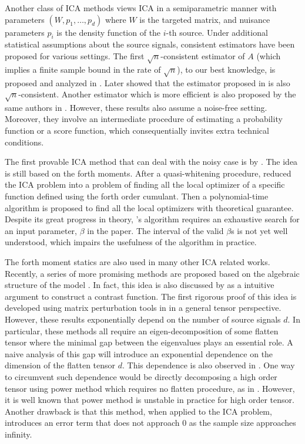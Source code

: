 \documentclass[twoside]{article}
\theoremstyle{definition}
\begin{document}
Another class of ICA methods views ICA in a semiparametric manner with parameters $(W, p_1, \ldots, p_d)$ where $W$ is the targeted matrix, and nuisance parameters $p_i$ is the density function of the $i$-th source. 
Under additional statistical assumptions about the source signals, consistent estimators have been proposed for various settings. The first  $\sqrt{n}$-consistent estimator of $A$ (which implies a finite sample bound in the rate of $\sqrt{n}$), to our best knowledge, is proposed and analyzed in \citet{samarov2004nonparametric}.  
Later \citep{chen2005consistent} showed that the estimator proposed in \citet{eriksson2003characteristic} is also $\sqrt{n}$-consistent. Another estimator which is more efficient is also proposed by the same authors in \citep{chen2006efficient}.
However, these results also assume a noise-free setting. 
Moreover, they involve an intermediate procedure of estimating a probability function or a score function, which consequentially invites extra technical conditions. 

The first provable ICA method that can deal with the noisy case is by \citep{arora2012provable}. 
The idea is still based on the forth moments. 
After a quasi-whitening procedure, \citep{arora2012provable} reduced the ICA problem into a problem of finding all the local optimizer of a specific function defined using the forth order cumulant. Then a polynomial-time algorithm is proposed to find all the local optimizers with theoretical guarantee.
Despite its great progress in theory, \citep{arora2012provable}'s algorithm requires an exhaustive search for an input parameter, $\beta$ in the paper.
The interval of the valid $\beta$s is not yet well understood, which impairs the usefulness of the algorithm in practice.

The forth moment statics are also used in many other ICA related works. 
Recently, a series of more promising methods are proposed based on the algebraic structure of the model \citep{hsu2013learning,anandkumar2012tensordecomposition,anandkumar2012method}. 
In fact, this idea is also discussed by \citet{cardoso1999high} as a intuitive argument to construct a contrast function. 
The first rigorous proof of this idea is developed using matrix perturbation tools in \citep{anandkumar2012tensordecomposition,anandkumar2012method,goyal2014fourier} in a general tensor perspective. 
However, these results exponentially depend on the number of source signals $d$.
In particular, these methods all require an eigen-decomposition of some flatten tensor where the minimal gap between the eigenvalues plays an essential role. 
A naive analysis of this gap will introduce an exponential dependence on the dimension of the flatten tensor $d$. 
This dependence is also observed in \citep{cardoso1999high,goyal2014fourier}.
One way to circumvent such dependence would be directly decomposing a high order tensor using power method which requires no flatten procedure, as in \citep{anandkumar2014guaranteed}. 
However, it is well known that power method is unstable in practice for high order tensor. 
Another drawback is that this method, when applied to the ICA problem, introduces an error term that does not approach 0 as the sample size approaches infinity. 
\end{document}
